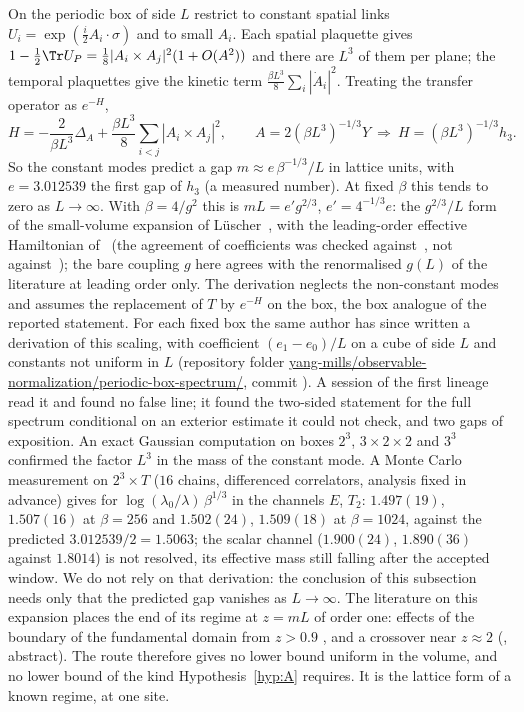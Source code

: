 On the periodic box of side $L$ restrict to constant spatial links $U_i=\exp(\tfrac{i}{2}A_i\cdot\sigma)$
and to small $A_i$. Each spatial plaquette gives $1-\tfrac12\Tr U_P=\tfrac18|A_i\times A_j|^2(1+O(A^2))$ and
there are $L^3$ of them per plane; the temporal plaquettes give the kinetic term
$\tfrac{\beta L^3}{8}\sum_i|\dot A_i|^2$. Treating the transfer operator as $e^{-H}$,
\[
H=-\frac{2}{\beta L^3}\Delta_A+\frac{\beta L^3}{8}\sum_{i<j}|A_i\times A_j|^2,
\qquad A=2(\beta L^3)^{-1/3}Y \ \Longrightarrow\ H=(\beta L^3)^{-1/3}h_3 .
\]
So the constant modes predict a gap $m\approx e\,\beta^{-1/3}/L$ in lattice units, with $e=3.012539$ the
first gap of $h_3$ (a measured number). At fixed $\beta$ this tends to zero as $L\to\infty$.
With $\beta=4/g^2$ this is $mL=e'g^{2/3}$, $e'=4^{-1/3}e$: the $g^{2/3}/L$ form of the small-volume
expansion of L\"uscher~\cite{Lu83}, with the leading-order effective Hamiltonian of~\cite[eq.~(9)]{vB00}
(the agreement of coefficients was checked against~\cite{vB00}, not against~\cite{Lu83}); the bare coupling $g$ here agrees with the
renormalised $g(L)$ of the literature at leading order only. The derivation neglects the non-constant
modes and assumes the replacement of $T$ by $e^{-H}$ on the box, the box analogue of the reported
statement. For each fixed box the same author has since written a derivation of this scaling, with
coefficient $(e_1-e_0)/L$ on a cube of side $L$ and constants not uniform in $L$ (repository folder
\url{yang-mills/observable-normalization/periodic-box-spectrum/}, commit ). A session of the
first lineage read it and found no false line; it found the two-sided statement for the full spectrum
conditional on an exterior estimate it could not check, and two gaps of exposition. An exact Gaussian
computation on boxes $2^3$, $3\times2\times2$ and $3^3$ confirmed the factor $L^3$ in the mass of the constant
mode. A Monte Carlo measurement on $2^3\times T$ ($16$ chains, differenced correlators, analysis fixed in advance) gives for
$\log(\lambda_0/\lambda)\,\beta^{1/3}$ in the channels $E$, $T_2$: $1.497(19)$, $1.507(16)$ at $\beta=256$ and $1.502(24)$,
$1.509(18)$ at $\beta=1024$, against the predicted $3.012539/2=1.5063$; the scalar channel ($1.900(24)$, $1.890(36)$
against $1.8014$) is not resolved, its effective mass still falling after the accepted window. We do not
rely on that derivation: the conclusion of this subsection needs only that the predicted gap vanishes as
$L\to\infty$.
The literature on this expansion places the end of its regime at $z=mL$ of order one: effects of the
boundary of the fundamental domain from $z>0.9$ \cite[pp.~11--12]{vB00}, and a crossover near $z\approx2$
(\cite{LM84}, abstract). The route therefore gives no lower bound uniform in the volume, and no lower bound
of the kind Hypothesis~\ref{hyp:A} requires. It is the lattice form of a known regime, at one site.

